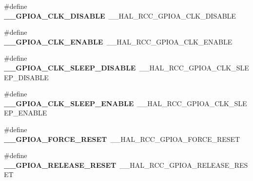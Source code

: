\begin{DoxyCompactItemize}
\item 
\hypertarget{group___h_a_l___r_c_c___aliased_gaeade76c4127a8e0e0f8e0e30d8ed5602}{\#define {\bfseries \-\_\-\-\_\-\-G\-P\-I\-O\-A\-\_\-\-C\-L\-K\-\_\-\-D\-I\-S\-A\-B\-L\-E}~\-\_\-\-\_\-\-H\-A\-L\-\_\-\-R\-C\-C\-\_\-\-G\-P\-I\-O\-A\-\_\-\-C\-L\-K\-\_\-\-D\-I\-S\-A\-B\-L\-E}\label{group___h_a_l___r_c_c___aliased_gaeade76c4127a8e0e0f8e0e30d8ed5602}

\item 
\hypertarget{group___h_a_l___r_c_c___aliased_gae43275a9c80a46273ae4a05cee055cb0}{\#define {\bfseries \-\_\-\-\_\-\-G\-P\-I\-O\-A\-\_\-\-C\-L\-K\-\_\-\-E\-N\-A\-B\-L\-E}~\-\_\-\-\_\-\-H\-A\-L\-\_\-\-R\-C\-C\-\_\-\-G\-P\-I\-O\-A\-\_\-\-C\-L\-K\-\_\-\-E\-N\-A\-B\-L\-E}\label{group___h_a_l___r_c_c___aliased_gae43275a9c80a46273ae4a05cee055cb0}

\item 
\hypertarget{group___h_a_l___r_c_c___aliased_gac3fe0ce119ec3107d46637f728c85d97}{\#define {\bfseries \-\_\-\-\_\-\-G\-P\-I\-O\-A\-\_\-\-C\-L\-K\-\_\-\-S\-L\-E\-E\-P\-\_\-\-D\-I\-S\-A\-B\-L\-E}~\-\_\-\-\_\-\-H\-A\-L\-\_\-\-R\-C\-C\-\_\-\-G\-P\-I\-O\-A\-\_\-\-C\-L\-K\-\_\-\-S\-L\-E\-E\-P\-\_\-\-D\-I\-S\-A\-B\-L\-E}\label{group___h_a_l___r_c_c___aliased_gac3fe0ce119ec3107d46637f728c85d97}

\item 
\hypertarget{group___h_a_l___r_c_c___aliased_ga66771d9c903b9555e82911f0235ad591}{\#define {\bfseries \-\_\-\-\_\-\-G\-P\-I\-O\-A\-\_\-\-C\-L\-K\-\_\-\-S\-L\-E\-E\-P\-\_\-\-E\-N\-A\-B\-L\-E}~\-\_\-\-\_\-\-H\-A\-L\-\_\-\-R\-C\-C\-\_\-\-G\-P\-I\-O\-A\-\_\-\-C\-L\-K\-\_\-\-S\-L\-E\-E\-P\-\_\-\-E\-N\-A\-B\-L\-E}\label{group___h_a_l___r_c_c___aliased_ga66771d9c903b9555e82911f0235ad591}

\item 
\hypertarget{group___h_a_l___r_c_c___aliased_ga4d10503baeb5dc73fbb588ab1e7b4ddc}{\#define {\bfseries \-\_\-\-\_\-\-G\-P\-I\-O\-A\-\_\-\-F\-O\-R\-C\-E\-\_\-\-R\-E\-S\-E\-T}~\-\_\-\-\_\-\-H\-A\-L\-\_\-\-R\-C\-C\-\_\-\-G\-P\-I\-O\-A\-\_\-\-F\-O\-R\-C\-E\-\_\-\-R\-E\-S\-E\-T}\label{group___h_a_l___r_c_c___aliased_ga4d10503baeb5dc73fbb588ab1e7b4ddc}

\item 
\hypertarget{group___h_a_l___r_c_c___aliased_ga3ee01c02d3d446f9ec7894d90803f39f}{\#define {\bfseries \-\_\-\-\_\-\-G\-P\-I\-O\-A\-\_\-\-R\-E\-L\-E\-A\-S\-E\-\_\-\-R\-E\-S\-E\-T}~\-\_\-\-\_\-\-H\-A\-L\-\_\-\-R\-C\-C\-\_\-\-G\-P\-I\-O\-A\-\_\-\-R\-E\-L\-E\-A\-S\-E\-\_\-\-R\-E\-S\-E\-T}\label{group___h_a_l___r_c_c___aliased_ga3ee01c02d3d446f9ec7894d90803f39f}


\end{DoxyCompactItemize}
